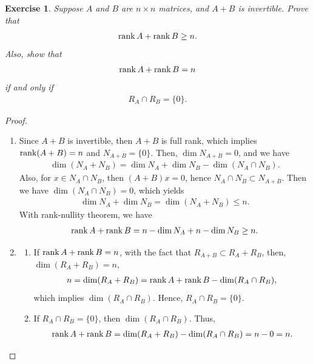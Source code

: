 \documentclass[11pt]{book}
\newtheorem{exercise}{Exercise}[section]
\theoremstyle{definition}
\numberwithin{equation}{chapter}
\begin{document}
\begin{exercise}
Suppose $A$ and $B$ are $n \times n$ matrices, and $A + B$ is invertible. Prove that 
\begin{align*}
    \rank A + \rank B \geq n.
\end{align*}
Also, show that 
\begin{align*}
    \rank A + \rank B = n
\end{align*}
if and only if
\begin{align*}
    R_A \cap R_B = \{0\}.
\end{align*}
\end{exercise}
\begin{proof}
~\begin{enumerate}[label=(\alph*)]
    \item Since $A + B$ is invertible, then $A + B$ is full rank, which implies $\rank (A+B) = n$ and $N_{A+B} = \{0\}$. Then, $\dim N_{A+B} = 0$, and we have 
    \begin{align*}
        \dim (N_A + N_B) = \dim N_A + \dim N_B - \dim (N_A \cap N_B).
    \end{align*}
    Also, for $x\in N_A \cap N_B$, then $(A + B)x = 0$, hence $N_A \cap N_B \subset N_{A+B}$. Then we have $\dim (N_A \cap N_B) = 0$, which yields
    \begin{align*}
        \dim N_A + \dim N_B = \dim (N_A + N_B) \leq n.
    \end{align*}
    With rank-nullity theorem, we have
    \begin{align*}
        \rank A + \rank B = n - \dim N_A + n - \dim N_B \geq n.
    \end{align*}
    
    \item \begin{enumerate}[label=\arabic*)]
        \item If $\rank A + \rank B = n$, with the fact that $R_{A+B} \subset R_A + R_B$, then, $\dim (R_A + R_B) = n$,
        \begin{align*}
            n = \dim (R_A + R_B) = \rank A + \rank B - \dim (R_A \cap R_B),
        \end{align*}
        which implies $\dim (R_A \cap R_B)$. Hence, $R_A \cap R_B = \{0\}$.
        
        \item If $R_A \cap R_B = \{0\}$, then $\dim (R_A \cap R_B)$. Thus,
        \begin{align*}
            \rank A + \rank B = \dim (R_A + R_B) - \dim (R_A \cap R_B) = n - 0 = n.
        \end{align*}
    \end{enumerate}
\end{enumerate}
\end{proof}
\end{document}
